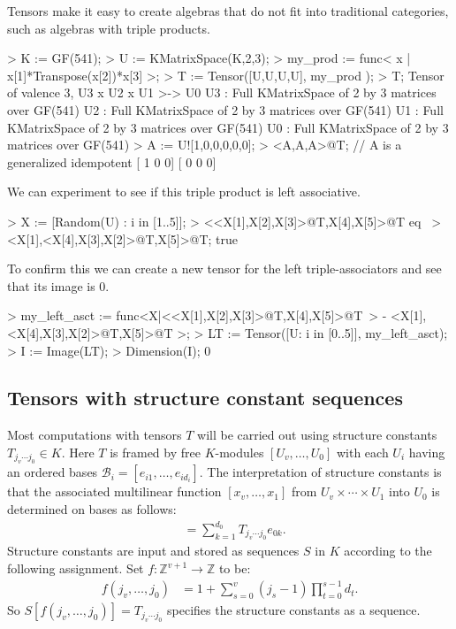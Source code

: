 \begin{example}
Tensors make it easy to create algebras that do not fit into traditional
categories, such as algebras with triple products.

\begin{code}
> K := GF(541);
> U := KMatrixSpace(K,2,3);
> my_prod := func< x | x[1]*Transpose(x[2])*x[3] >;
> T := Tensor([U,U,U,U], my_prod );
> T;
Tensor of valence 3, U3 x U2 x U1 >-> U0
U3 : Full KMatrixSpace of 2 by 3 matrices over GF(541)
U2 : Full KMatrixSpace of 2 by 3 matrices over GF(541)
U1 : Full KMatrixSpace of 2 by 3 matrices over GF(541)
U0 : Full KMatrixSpace of 2 by 3 matrices over GF(541)
> A := U![1,0,0,0,0,0];
> <A,A,A>@T;  // A is a generalized idempotent
[  1   0   0]
[  0   0   0]
\end{code}

We can experiment to see if this triple product is left associative.

\begin{code}
> X := [Random(U) : i  in [1..5]];
> <<X[1],X[2],X[3]>@T,X[4],X[5]>@T eq \
>     <X[1],<X[4],X[3],X[2]>@T,X[5]>@T;
true
\end{code}

To confirm this we can create a new tensor for the left 
triple-associators and see that its image is $0$.

\begin{code}
> my_left_asct := func<X|<<X[1],X[2],X[3]>@T,X[4],X[5]>@T\
>     - <X[1],<X[4],X[3],X[2]>@T,X[5]>@T >;
> LT := Tensor([U: i in [0..5]], my_left_asct);
> I := Image(LT);
> Dimension(I);
0
\end{code}
\end{example}

\subsection{Tensors with structure constant sequences}
Most computations with tensors $T$ will be carried out using structure constants
$T_{j_v\cdots j_0}\in K$.  Here $T$ is framed by free $K$-modules $[U_v,\dots,U_0]$ 
with each $U_i$ having an ordered bases $\mathcal{B}_i=[e_{i1},\dots,e_{id_i}]$.
The interpretation of structure constants is that the associated multilinear function 
$[x_v,\dots,x_1]$ from $U_v\times \cdots \times U_1$ into $U_0$ is determined on 
bases as follows:
\begin{align*}
	[e_{vj_v},\dots,e_{1j_1} ]& = \sum_{k=1}^{d_0} T_{j_v \cdots j_0} e_{0k}.
\end{align*}
Structure constants are input and stored as sequences $S$ in $K$ according to the
following assignment. Set $f:\mathbb{Z}^{v+1}\to \mathbb{Z}$ to be:
\begin{align*}
		 f(j_v,\dots,j_0) & = 1+\sum_{s=0}^v (j_s-1)\prod_{t=0}^{s-1} d_t.
\end{align*}
So $S[f(j_v,\dots,j_0)]=T_{j_v\cdots j_0}$ specifies the structure constants as a sequence.  
\smallskip


